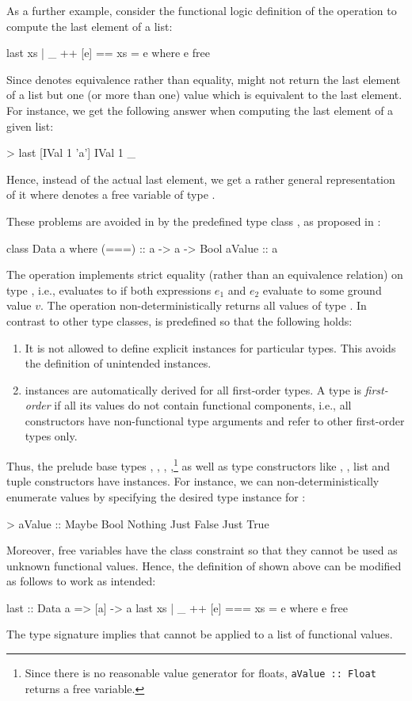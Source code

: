 As a further example, consider the functional logic definition
of the operation  to compute the last element of a list:
%
\begin{curry}
last xs | _ ++ [e] == xs = e
  where e free
\end{curry}
%
Since \ccode{==} denotes equivalence rather than equality,
 might not return the last element of a list
but one (or more than one) value which is equivalent to the
last element.
For instance, we get the following answer when computing the last element
of a given  list:
%
\begin{curry}
> last [IVal 1 'a']
IVal 1 _
\end{curry}
%
Hence, instead of the actual last element, we get a rather general
representation of it where \ccode{\us} denotes a free variable
of type .

These problems are avoided in \CYS by the predefined type class
,
as proposed in \cite{HanusTeegen20}:
%
\begin{curry}
class Data a where
  (===)  :: a -> a -> Bool
  aValue :: a
\end{curry}
%
The operation \ccode{===}\pindex{===} implements strict equality
(rather than an equivalence relation) on type ,
i.e.,  evaluates to 
if both expressions $e_1$ and $e_2$ evaluate to some ground value $v$.
The operation  non-deterministically returns
all values of type .
In contrast to other type classes,  is predefined
so that the following holds:
%
\begin{enumerate}
\item
It is not allowed to define explicit  instances
for particular types. This avoids the definition of unintended instances.
\item
{} instances are automatically derived
for all first-order types.
A type is \emph{first-order} if all its values
do not contain functional components,
i.e., all constructors have non-functional type arguments and
refer to other first-order types only.
\end{enumerate}
%
Thus, the prelude base types , , ,
,\footnote{Since there is no reasonable value generator
for floats, \texttt{aValue~::~Float} returns a free variable.}
 as well as type constructors like
, , list and tuple constructors
have  instances.
For instance, we can non-deterministically enumerate values
by specifying the desired type instance for :
%
\begin{curry}
> aValue :: Maybe Bool
Nothing
Just False
Just True
\end{curry}
%
Moreover, free variables have the class constraint 
so that they cannot be used as unknown functional values.
Hence, the definition of  shown above
can be modified as follows to work as intended:
%
\begin{curry}
last :: Data a => [a] -> a
last xs | _ ++ [e] === xs = e
  where e free
\end{curry}
%
The type signature implies that  cannot be applied
to a list of functional values.

